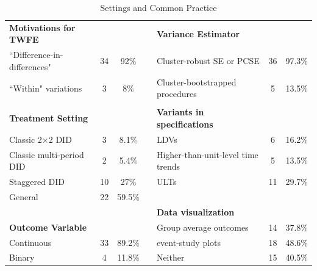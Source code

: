 \documentclass[12pt]{article}
\begin{document}
\begin{table}[!htbp]
  \centering\small
  \caption{Settings and Common Practice}\label{tb:practice}%
    \begin{tabular}{lccclcc}\hline\hline
        \textbf{Motivations for TWFE} &       &       &  &  \textbf{Variance Estimator}   &  &        \\ 
        ``Difference-in-differences" & 34     & 92\% &  &     Cluster-robust SE or PCSE & 36    & 97.3\%  \\
    ``Within" variations & 3     & 8\% &  &     Cluster-bootstrapped procedures & 5     & 13.5\%    \\
          &       &       &  &  \\
    \textbf{Treatment Setting} &       &       &  &  \textbf{Variants in specifications}   &  &        \\ 
    Classic 2$\times$2 DID & 3     & 8.1\% &       &  LDVs  & 6     & 16.2\%  \\
    Classic multi-period DID & 2     & 5.4\% &       & Higher-than-unit-level time trends & 5 & 13.5\% \\
    Staggered DID & 10    & 27\% &       & ULTs & 11     & 29.7\%  \\
    General & 22    & 59.5\% &       &    \\ 
          &       &       &  &                       \textbf{Data visualization}   \\
    \textbf{Outcome Variable} & &    &   & Group average outcomes & 14    & 37.8\%     \\ 
    Continuous  &  33   &  89.2\%     &    &  event-study plots & 18    & 48.6\%   \\ 
    Binary  &   4    &   11.8\%    &         & Neither   &  15  & 40.5\% \\ \hline
\end{tabular}%
\end{table}\vspace{-1em}%




\FloatBarrier

                                                                                          
\end{document}
